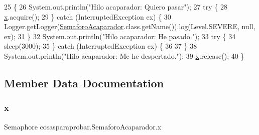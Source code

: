 \begin{DoxyCode}
25                       \{
26         System.out.println(\textcolor{stringliteral}{"Hilo acaparador: Quiero pasar"});
27         \textcolor{keywordflow}{try} \{
28             \mbox{\hyperlink{classcosasparaprobar_1_1_semaforo_acaparador_a20c0bcd988d575bb629fe6aa1c2a1a72}{x}}.acquire();
29         \} \textcolor{keywordflow}{catch} (InterruptedException ex) \{
30             Logger.getLogger(\mbox{\hyperlink{classcosasparaprobar_1_1_semaforo_acaparador_a8ce5bf41c9493ee9cef15fe9111322ad}{SemaforoAcaparador}}.class.getName()).log(Level.SEVERE, null, 
      ex);
31         \}
32         System.out.println(\textcolor{stringliteral}{"Hilo acaparador: He pasado."});
33         \textcolor{keywordflow}{try} \{
34             sleep(3000);
35         \} \textcolor{keywordflow}{catch} (InterruptedException ex) \{
36             
37         \}
38         System.out.println(\textcolor{stringliteral}{"Hilo acaparador: Me he despertado."});
39         \mbox{\hyperlink{classcosasparaprobar_1_1_semaforo_acaparador_a20c0bcd988d575bb629fe6aa1c2a1a72}{x}}.release();
40     \}
\end{DoxyCode}


\subsection{Member Data Documentation}
\mbox{\label{classcosasparaprobar_1_1_semaforo_acaparador_a20c0bcd988d575bb629fe6aa1c2a1a72}} 
\subsubsection{\texorpdfstring{x}{x}}
{\footnotesize\ttfamily Semaphore cosasparaprobar.\+Semaforo\+Acaparador.\+x\hspace{0.3cm}{\ttfamily [package]}}

